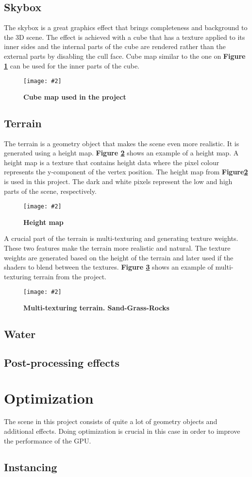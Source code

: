 \documentclass[10pt, a4paper]{article}
\newcommand{\figuremacro}[5]{
    \begin{figure}[#1]
        \centering
        \texttt{[image: \#2]}
        \caption[#3]{\textbf{#3}#4}
        \label{fig:#2}
    \end{figure}
}
\begin{document}
	\subsection{Skybox}
	The skybox is a great graphics effect that brings completeness and background to the 3D scene. The effect is achieved with a cube that has a texture applied to its inner sides and the internal parts of the cube are rendered rather than the external parts by disabling the cull face. Cube map similar to the one on \textbf{Figure {\ref{fig:skybox}}} can be used for the inner parts of the cube.
	\figuremacro{h}{skybox}{Cube map used in the project}{ }{0.9}	
	\subsection{Terrain}
	The terrain is a geometry object that makes the scene even more realistic. It is generated using a height map. \textbf{Figure {\ref{fig:heightmap}}} shows an example of a height map. A height map is a texture that contains height data where the pixel colour represents the y-component of the vertex position. The height map from \textbf{Figure{\ref{fig:heightmap}}} is used in this project. The dark and white pixels represent the low and high parts of the scene, respectively. 
	\figuremacro{h}{heightmap}{Height map}{ }{1.0}
	A crucial part of the terrain is multi-texturing and generating texture weights. These two features make the terrain more realistic and natural. The texture weights are generated based on the height of the terrain and later used if the shaders to blend between the textures. \textbf{Figure {\ref{fig:multiTexturing}}} shows an example of multi-texturing terrain from the project.
	\figuremacro{h}{multiTexturing}{Multi-texturing terrain. Sand-Grass-Rocks}{ }{1.0}
	\subsection{Water}
	\subsection{Post-processing effects}
	\section{Optimization}
	The scene in this project consists of quite a lot of geometry objects and additional effects. Doing optimization is crucial in this case in order to improve the performance of the GPU.
	\subsection{Instancing}
	
\end{document}
